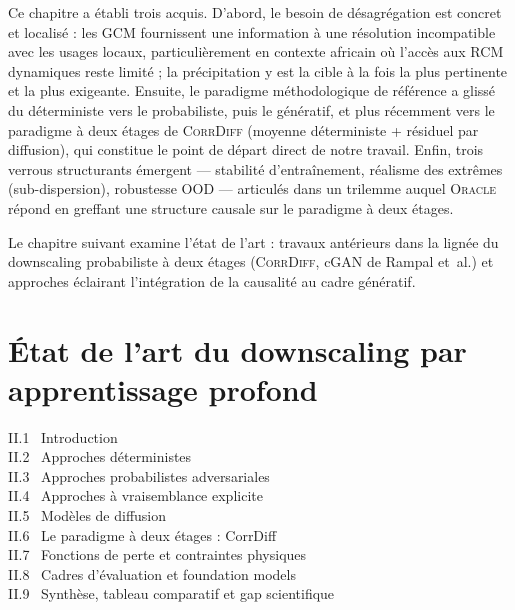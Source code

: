 \documentclass[14pt,a4paper,openany]{extreport}
\theoremstyle{definition}
\newcommand{\Oracle}{\textsc{Oracle}}
\newcommand{\CorrDiff}{\textsc{CorrDiff}}
\begin{document}
Ce chapitre a établi trois acquis. D'abord, le besoin de désagrégation est concret et localisé : les GCM fournissent une information à une résolution incompatible avec les usages locaux, particulièrement en contexte africain où l'accès aux RCM dynamiques reste limité ; la précipitation y est la cible à la fois la plus pertinente et la plus exigeante. Ensuite, le paradigme méthodologique de référence a glissé du déterministe vers le probabiliste, puis le génératif, et plus récemment vers le paradigme à deux étages de \CorrDiff{} (moyenne déterministe + résiduel par diffusion), qui constitue le point de départ direct de notre travail. Enfin, trois verrous structurants émergent --- stabilité d'entraînement, réalisme des extrêmes (sub-dispersion), robustesse OOD --- articulés dans un trilemme auquel \Oracle{} répond en greffant une structure causale sur le paradigme à deux étages.

Le chapitre suivant examine l'état de l'art : travaux antérieurs dans la lignée du downscaling probabiliste à deux étages (\CorrDiff{}, cGAN de Rampal et~al.) et approches éclairant l'intégration de la causalité au cadre génératif.

\cleardoublepage



\chapter{État de l'art du downscaling par apprentissage profond}
\label{chap:etatdelart}

\begin{sommairebox}
\small
\noindent II.1 \ Introduction \dotfill \pageref{sec:soa-intro}\\
\noindent II.2 \ Approches déterministes \dotfill \pageref{sec:soa-det}\\
\noindent II.3 \ Approches probabilistes adversariales \dotfill \pageref{sec:soa-adv}\\
\noindent II.4 \ Approches à vraisemblance explicite \dotfill \pageref{sec:soa-vrai}\\
\noindent II.5 \ Modèles de diffusion \dotfill \pageref{sec:soa-diff}\\
\noindent II.6 \ Le paradigme à deux étages : CorrDiff \dotfill \pageref{sec:soa-corrdiff}\\
\noindent II.7 \ Fonctions de perte et contraintes physiques \dotfill \pageref{sec:soa-pertes}\\
\noindent II.8 \ Cadres d'évaluation et foundation models \dotfill \pageref{sec:soa-benchmarks}\\
\noindent II.9 \ Synthèse, tableau comparatif et gap scientifique \dotfill \pageref{sec:soa-synthese}
\end{sommairebox}
\end{document}
